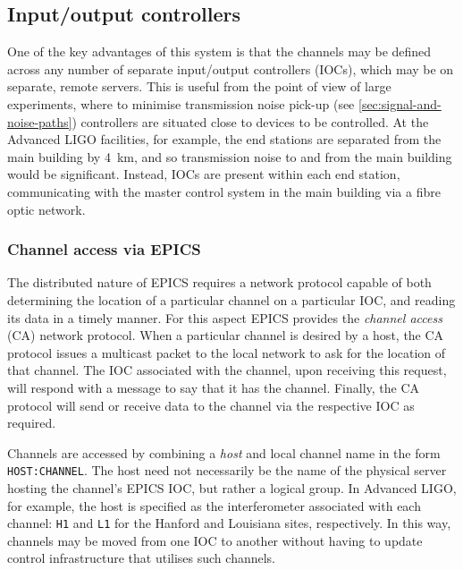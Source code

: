 \subsection{Input/output controllers}
One of the key advantages of this system is that the channels may be defined across any number of separate input/output controllers (\glspl{IOC}), which may be on separate, remote servers. This is useful from the point of view of large experiments, where to minimise transmission noise pick-up (see \ref{sec:signal-and-noise-paths}) controllers are situated close to devices to be controlled. At the Advanced LIGO facilities, for example, the end stations are separated from the main building by \SI{4}{\kilo\meter}, and so transmission noise to and from the main building would be significant. Instead, \glspl{IOC} are present within each end station, communicating with the master control system in the main building via a fibre optic network.

\subsubsection{Channel access via EPICS}
The distributed nature of \gls{EPICS} requires a network protocol capable of both determining the location of a particular channel on a particular \gls{IOC}, and reading its data in a timely manner. For this aspect \gls{EPICS} provides the \emph{channel access} (\gls{CA}) network protocol. When a particular channel is desired by a host, the \gls{CA} protocol issues a multicast packet to the local network to ask for the location of that channel. The \gls{IOC} associated with the channel, upon receiving this request, will respond with a message to say that it has the channel. Finally, the \gls{CA} protocol will send or receive data to the channel via the respective \gls{IOC} as required.

Channels are accessed by combining a \emph{host} and local channel name in the form \lstinline!HOST:CHANNEL!. The host need not necessarily be the name of the physical server hosting the channel's \gls{EPICS} \gls{IOC}, but rather a logical group. In Advanced LIGO, for example, the host is specified as the interferometer associated with each channel: \lstinline!H1! and \lstinline!L1! for the Hanford and Louisiana sites, respectively. In this way, channels may be moved from one \gls{IOC} to another without having to update control infrastructure that utilises such channels.

